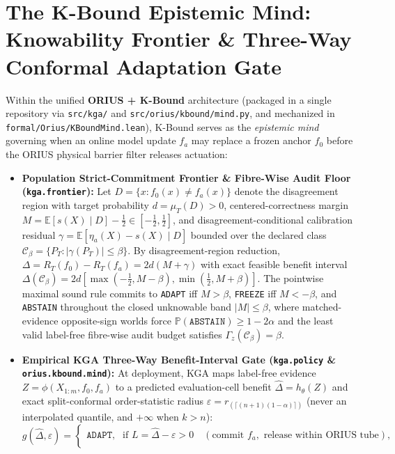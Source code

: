\section{The K-Bound Epistemic Mind: Knowability Frontier \& Three-Way Conformal Adaptation Gate}
Within the unified \textbf{ORIUS + K-Bound} architecture (packaged in a single repository via \texttt{src/\allowbreak kga/} and \texttt{src/\allowbreak orius/\allowbreak kbound/\allowbreak mind.py}, and mechanized in \texttt{formal/\allowbreak Orius/\allowbreak KBoundMind.lean}), K-Bound serves as the \emph{epistemic mind} governing when an online model update $f_a$ may replace a frozen anchor $f_0$ before the ORIUS physical barrier filter releases actuation:
\begin{itemize}
    \item \textbf{Population Strict-Commitment Frontier \& Fibre-Wise Audit Floor (\texttt{kga.frontier}):} Let $D = \{x : f_0(x) \ne f_a(x)\}$ denote the disagreement region with target probability $d = \mu_T(D) > 0$, centered-correctness margin $M = \mathbb{E}[s(X)\mid D] - \frac{1}{2} \in [-\frac{1}{2}, \frac{1}{2}]$, and disagreement-conditional calibration residual $\gamma = \mathbb{E}[\eta_a(X) - s(X)\mid D]$ bounded over the declared class $\mathcal{C}_\beta = \{P_T : |\gamma(P_T)| \le \beta\}$. By disagreement-region reduction, $\Delta = R_T(f_0) - R_T(f_a) = 2d(M + \gamma)$ with exact feasible benefit interval $\Delta(\mathcal{C}_\beta) = 2d[\max(-\frac{1}{2}, M-\beta), \min(\frac{1}{2}, M+\beta)]$. The pointwise maximal sound rule commits to \texttt{ADAPT} iff $M > \beta$, \texttt{FREEZE} iff $M < -\beta$, and \texttt{ABSTAIN} throughout the closed unknowable band $|M| \le \beta$, where matched-evidence opposite-sign worlds force $\mathbb{P}(\texttt{ABSTAIN}) \ge 1 - 2\alpha$ and the least valid label-free fibre-wise audit budget satisfies $\Gamma_z(\mathcal{C}_\beta) = \beta$.
    \item \textbf{Empirical KGA Three-Way Benefit-Interval Gate (\texttt{kga.policy} \& \texttt{orius.kbound.mind}):} At deployment, KGA maps label-free evidence $Z = \phi(X_{1:m}, f_0, f_a)$ to a predicted evaluation-cell benefit $\hat{\Delta} = h_\theta(Z)$ and exact split-conformal order-statistic radius $\varepsilon = r_{(\lceil (n+1)(1-\alpha)\rceil)}$ (never an interpolated quantile, and $+\infty$ when $k > n$):
    \[
      g(\hat{\Delta}, \varepsilon) = \begin{cases}
        \texttt{ADAPT}, & \text{if } L = \hat{\Delta} - \varepsilon > 0 \quad (\text{commit } f_a, \text{ release within ORIUS tube}), \\

\end{cases}\]
\end{itemize}
